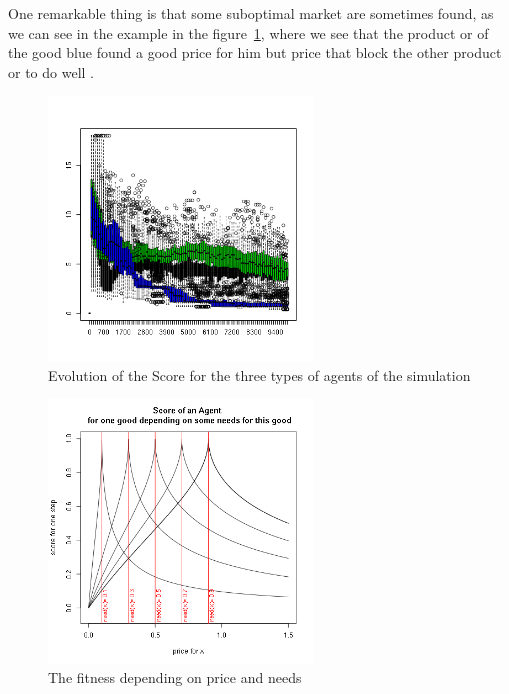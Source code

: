 \documentclass{wscpaperproc}
\begin{document}
One remarkable thing is that some suboptimal  market are sometimes found, as we can see in the example in the figure~\ref{fig:suboptimal}, where we see that the product or of the good blue found a good price for him but price that block the other product or to do well .


\begin{figure}[htp]
	\begin{center}
		\includegraphics[width=7cm]{img/suboptimal.png}
	\end{center}
	\caption{Evolution of the Score for the three types of agents of the simulation}
	\label{fig:suboptimal}
\end{figure}






\begin{figure}[htp]
	\begin{center}
		\includegraphics[width=7cm]{img/fitness.png}
	\end{center}
	\caption{The fitness depending on price and needs}
	\label{fig:fit}
\end{figure}
\end{document}
